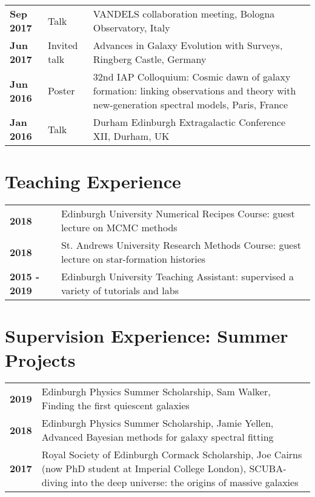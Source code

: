 \documentclass[a4paper,fleqn,usenatbib,onecolumn]{mnras}
\begin{document}
\begin{longtable}{ p{2.5cm} p{2.5cm} p{12cm} }
\bf{Sep 2017} & Talk & VANDELS collaboration meeting, Bologna Observatory, Italy\\

\bf{Jun 2017} & Invited talk & Advances in Galaxy Evolution with Surveys, Ringberg Castle, Germany\\

\bf{Jun 2016} & Poster & 32nd IAP Colloquium: Cosmic dawn of galaxy formation: linking observations and theory with new-generation spectral models, Paris, France \\

\bf{Jan 2016} & Talk & Durham Edinburgh Extragalactic Conference XII, Durham, UK\\

\end{longtable}
\endgroup


\section*{Teaching Experience}
\begingroup
\setlength{\tabcolsep}{0pt} %
\renewcommand{\arraystretch}{1.4} %
\begin{longtable}{ p{3cm} p{14cm} }

\bf{2018} & Edinburgh University Numerical Recipes Course: guest lecture on MCMC methods\\

\bf{2018} & St. Andrews University Research Methods Course: guest lecture on star-formation histories\\

\bf{2015 - 2019} & Edinburgh University Teaching Assistant: supervised a variety of tutorials and labs\\

\end{longtable}
\endgroup

\section*{Supervision Experience: Summer Projects}
\begingroup
\setlength{\tabcolsep}{0pt} %
\renewcommand{\arraystretch}{1.4} %
\begin{longtable}{ p{2cm} p{15cm} }

\bf{2019} & Edinburgh Physics Summer Scholarship, Sam Walker, Finding the first quiescent galaxies\\

\bf{2018} & Edinburgh Physics Summer Scholarship, Jamie Yellen, Advanced Bayesian methods for galaxy spectral fitting\\

\bf{2017} & Royal Society of Edinburgh Cormack Scholarship, Joe Cairns (now PhD student at Imperial College London), SCUBA-diving into the deep universe: the origins of massive galaxies\\

\end{longtable}
\endgroup
\end{document}
